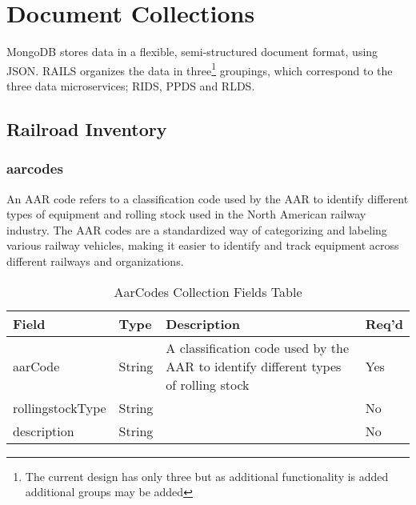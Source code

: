 \section{Document Collections}
MongoDB stores data in a flexible, semi-structured document format, using JSON. \ac{RAILS} organizes the data in three\footnote{The current design has only three but as additional functionality is added additional groups may be added} groupings, which correspond to the three data microservices; \ac{RIDS}, \ac{PPDS} and \ac{RLDS}.
\subsection{Railroad Inventory}
\subsubsection{aarcodes}\label{aarcode}
An \ac{AAR} code refers to a classification code used by the \ac{AAR} to identify different types of equipment and rolling stock used in the North American railway industry. The AAR codes are a standardized way of categorizing and labeling various railway vehicles, making it easier to identify and track equipment across different railways and organizations.
\begin{table}[H]
    \begin{tabular}{|L{3cm}|L{1.7cm}|L{8.8cm}|L{1.3cm}|}
    \hline
        \textbf{Field} & \textbf{Type} & \textbf{Description} & \textbf{Req'd} \\ \hline
        aarCode & String & A classification code used by the \ac{AAR} to identify different types of rolling stock & Yes \\ \hline
        rollingstockType & String & & No\\ \hline
        description & String & & No \\ \hline
    \end{tabular}
    \caption{\label{aarcode-table}AarCodes Collection Fields Table}
    \end{table}
